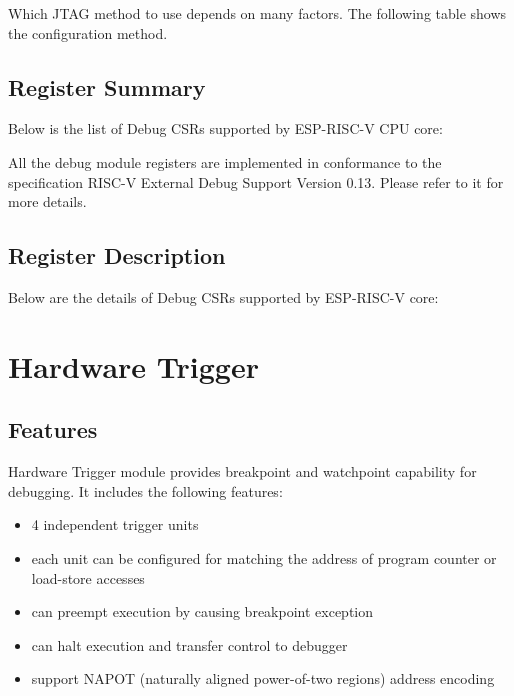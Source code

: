 \documentclass[main\_\_EN.tex]{subfiles}
\begin{document}
Which JTAG method to use depends on many factors. The following table shows the configuration method.






\hypertarget{riscvcpu-dbg-reg-summ}{}
\subsection{Register Summary}
\label{sec:riscvcpu-dbg-reg-summ}


Below is the list of Debug CSRs supported by ESP-RISC-V CPU core:


All the debug module registers are implemented in conformance to the specification RISC-V External Debug Support Version 0.13. Please refer to it for more details.



\subsection{Register Description}
Below are the details of Debug CSRs supported by ESP-RISC-V core:




\clearpage
\section{Hardware Trigger}
\label{sec:riscvcpu-hwt}


\subsection{Features}
\label{sec:riscvcpu-hwt-features}

Hardware Trigger module provides breakpoint and watchpoint capability for debugging. It includes the following features:

\begin{itemize}
    \item 4 independent trigger units
    \item each unit can be configured for matching the address of program counter or load-store accesses
    \item can preempt execution by causing breakpoint exception
    \item can halt execution and transfer control to debugger
    \item support NAPOT (naturally aligned power-of-two regions) address encoding
\end{itemize}
\end{document}
